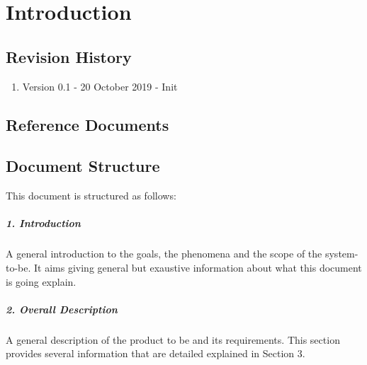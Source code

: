 \documentclass[../rasd.tex]{subfiles}
\begin{document}
\chapter{Introduction}
\thispagestyle{fancy}
		
		
		
		
		
	
		\section{Revision History}
		\begin{enumerate}
			\item Version 0.1 - 20 October 2019 - Init

		\end{enumerate}
		\section{Reference Documents}
		\section{Document Structure}
		This document is structured as follows:
		\paragraph{1. Introduction}
		A general introduction to the goals, the phenomena and the scope of the system-to-be. It aims giving general but exaustive information about what this document is going explain.
		\paragraph{2. Overall Description}
		A general description of the product to be and its requirements. This section provides several information that are detailed explained in Section 3.
\end{document}
